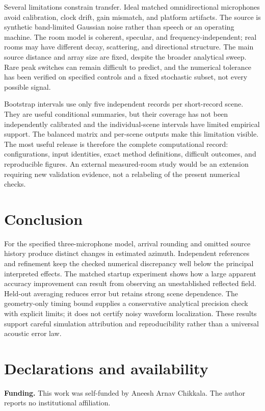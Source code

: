 \documentclass[10pt,a4paper,twocolumn]{article}
\begin{document}
Several limitations constrain transfer. Ideal matched omnidirectional microphones avoid calibration, clock drift, gain mismatch, and platform artifacts. The source is synthetic band-limited Gaussian noise rather than speech or an operating machine. The room model is coherent, specular, and frequency-independent; real rooms may have different decay, scattering, and directional structure. The main source distance and array size are fixed, despite the broader analytical sweep. Rare peak switches can remain difficult to predict, and the numerical tolerance has been verified on specified controls and a fixed stochastic subset, not every possible signal.

Bootstrap intervals use only five independent records per short-record scene. They are useful conditional summaries, but their coverage has not been independently calibrated and the individual-scene intervals have limited empirical support. The balanced matrix and per-scene outputs make this limitation visible. The most useful release is therefore the complete computational record: configurations, input identities, exact method definitions, difficult outcomes, and reproducible figures. An external measured-room study would be an extension requiring new validation evidence, not a relabeling of the present numerical checks.

\section{Conclusion}
For the specified three-microphone model, arrival rounding and omitted source history produce distinct changes in estimated azimuth. Independent references and refinement keep the checked numerical discrepancy well below the principal interpreted effects. The matched startup experiment shows how a large apparent accuracy improvement can result from observing an unestablished reflected field. Held-out averaging reduces error but retains strong scene dependence. The geometry-only timing bound supplies a conservative analytical precision check with explicit limits; it does not certify noisy waveform localization. These results support careful simulation attribution and reproducibility rather than a universal acoustic error law.

\section*{Declarations and availability}
\textbf{Funding.} This work was self-funded by Aneesh Arnav Chikkala. The author reports no institutional affiliation.
\end{document}
